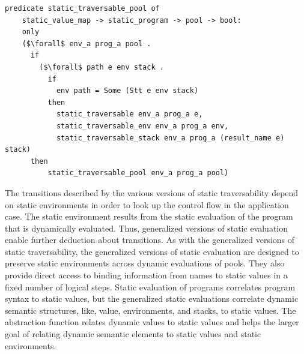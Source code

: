 \documentclass{article}
\begin{document}
\begin{lstlisting}[language=logic, mathescape]
  predicate static_traversable_pool of
    static_value_map -> static_program -> pool -> bool:
    only
    ($\forall$ env_a prog_a pool .
      if
        ($\forall$ path e env stack .
          if
            env path = Some (Stt e env stack)
          then 
            static_traversable env_a prog_a e, 
            static_traversable_env env_a prog_a env, 
            static_traversable_stack env_a prog_a (result_name e) stack) 
      then
          static_traversable_pool env_a prog_a pool)
  \end{lstlisting}

The transitions described by the various versions of static traversability depend on static
environments in order to look up the control flow in the application case.
The static environment
results from the static evaluation of the program that is dynamically evaluated. Thus,
generalized
versions of static evaluation enable further deduction about transitions.
As with the generalized versions of static traversability,
the generalized versions of static evaluation are designed to
preserve static environments across
dynamic evaluations of pools. They also provide direct access to binding information from names
to static values in a fixed number of logical steps. Static evaluation of programs correlates
program syntax to static values, but the generalized static evaluations correlate dynamic
semantic structures, like, value, environments, and stacks, to static values. The abstraction
function relates dynamic values to static values and helps the larger goal of relating dynamic
semantic elements to static values and static environments.    
\end{document}
